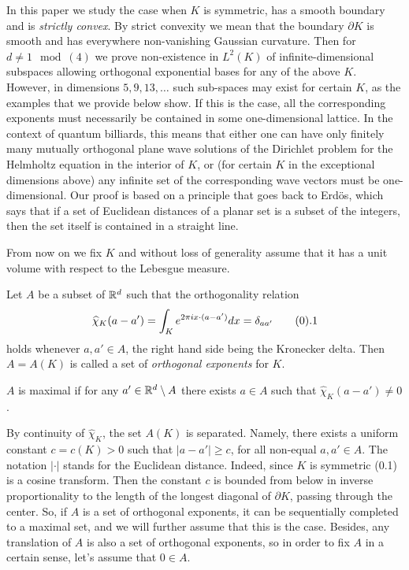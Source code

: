 In this paper we study the case when $K$ is symmetric, has a
smooth boundary and is {\it strictly convex}. By strict
convexity we mean that the boundary $\partial K$ is smooth and
has everywhere non-vanishing Gaussian curvature. Then for $d\neq
1 \mod(4)$ we prove non-existence in $L^2(K)$ of
infinite-dimensional subspaces allowing orthogonal exponential
bases for any of the above $K$. However, in dimensions
$5,9,13,\ldots$ such sub-spaces may exist for certain $K$, as
the examples that we provide below show. If this is the case,
all the corresponding exponents must necessarily be contained in
some one-dimensional lattice. In the context of quantum
billiards, this means that either one can have only finitely
many mutually orthogonal plane wave solutions of the Dirichlet
problem for the Helmholtz equation in the interior of $K$, or
(for certain $K$ in the exceptional dimensions above) any
infinite set of the corresponding wave vectors must be
one-dimensional. Our proof is based on a principle that goes
back to Erd\"{o}s, which says that if a set of Euclidean
distances of a planar set is a subset of the integers, then the
set itself is contained in a straight line.

From now on we fix $K$ and without loss of generality assume
that it has a unit volume with respect to the Lebesgue measure.

 Let $A$ be a subset of ${\Bbb R}^d$ such
that the orthogonality relation
$$ \widehat{\chi}_K(a-a')=\int_K e^{2 \pi i x \cdot (a-a')} dx=
\delta_{aa'} \tag0.1$$ holds whenever $a,a' \in A$, the right
hand side being the Kronecker delta. Then $A=A(K)$ is called a
set of {\it orthogonal exponents} for $K$. \enddefinition

 $A$ is maximal if for any
$a'\in {\Bbb R}^d\setminus A$
there exists $a\in A$ such that
$ \widehat{\chi}_K(a-a')\neq0$. \enddefinition

By continuity of $\widehat{\chi}_K$, the set $A(K)$ is
separated.  Namely, there exists a uniform constant $c=c(K)>0$
such that $|a-a'| \ge c$, for all non-equal $a,a' \in A$. The
notation $|\cdot|$ stands for the Euclidean distance. Indeed,
since $K$ is symmetric (0.1) is a cosine transform. Then the
constant $c$ is bounded from below in inverse proportionality to
the length of the longest diagonal of $\partial K$, passing
through the center. So, if $A$ is a set of orthogonal exponents,
it can be sequentially completed to a maximal set, and we will
further assume that this is the case. Besides, any translation
of $A$ is also a set of orthogonal exponents, so in order to fix
$A$ in a certain sense, let's assume that $0\in A$.



